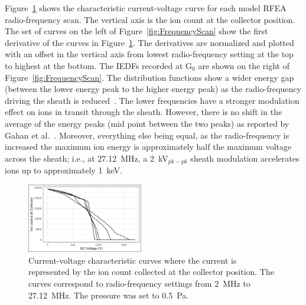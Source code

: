 Figure~\ref{fig:IVcurve_FrequencyScan} shows the characteristic current-voltage curve for each model RFEA radio-frequency scan. The vertical axis is the ion count at the collector position. The set of curves on the left of Figure~\ref{fig:FrequencyScan} show the first derivative of the curves in Figure~\ref{fig:IVcurve_FrequencyScan}. The derivatives are normalized and plotted with an offset in the vertical axis from lowest radio-frequency setting at the top to highest at the bottom. The IEDFs recorded at G$_0$ are shown on the right of Figure~\ref{fig:FrequencyScan}. The distribution functions show a wider energy gap (between the lower energy peak to the higher energy peak) as the radio-frequency driving the sheath is reduced~\cite{Lieberman2005}. The lower frequencies have a stronger modulation effect on ions in transit through the sheath. However, there is no shift in the average of the energy peaks (mid point between the two peaks) as reported by Gahan et al.~\cite{Gahan2008}. Moreover, everything else being equal, as the radio-frequency is increased the maximum ion energy is approximately half the maximum voltage across the sheath; i.e., at 27.12~MHz, a 2~kV$_{pk-pk}$ sheath modulation accelerates ions up to approximately 1~keV.  

\begin{figure}[htbp]
\centering
\includegraphics[width=0.45\textwidth]{Figures/IVcurve_FrequencyScan.jpeg}
\caption{Current-voltage characteristic curves where the current is represented by the ion count collected at the collector position. The curves correspond to radio-frequency settings from 2~MHz to 27.12~MHz. The pressure was set to 0.5~Pa. }
\label{fig:IVcurve_FrequencyScan}
\end{figure}

